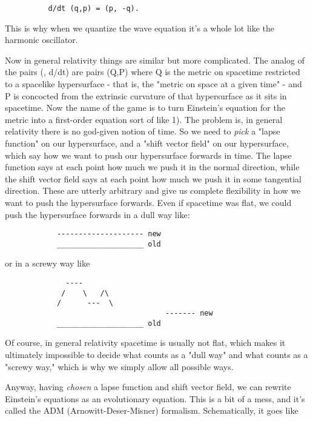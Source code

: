 \begin{verbatim}
		  d/dt (q,p) = (p, -q).  
\end{verbatim}
    
This is why when we quantize the wave equation it's a whole lot like the
harmonic oscillator.

Now in general relativity things are similar but more complicated.  
The analog of the pairs (\phi , d\phi /dt) are pairs (Q,P) where Q is the
metric on spacetime restricted to a spacelike hypersurface - that is,
the "metric on space at a given time" - and P is concocted from the
extrinsic curvature of that hypersurface as it sits in spacetime.   
Now the name of the game is to turn Einstein's equation for the metric
into a first-order equation sort of like 1).  The problem is, in general
relativity there is no god-given notion of time.  So we need to \emph{pick} a
"lapse function" on our hypersurface, and a "shift vector field" on our
hypersurface, which say how we want to push our hypersurface forwards in
time.  The lapse function says at each point how much we push it in the
normal direction, while the shift vector field says at each point how
much we push it in some tangential direction.  These are utterly
arbitrary and give us complete flexibility in how we want to push the
hypersurface forwards.  Even if spacetime was flat, we could push the
hypersurface forwards in a dull way like:




\begin{verbatim}
			-------------------- new
			____________________ old

\end{verbatim}
    
or in a screwy way like

\begin{verbatim}
			  ----
 			 /    \   /\
			/      ---  \
                                     ------- new
			____________________ old

\end{verbatim}
    
Of course, in general relativity spacetime is usually not flat, which
makes it ultimately impossible to decide what counts as a "dull way" and
what counts as a "screwy way," which is why we simply allow all possible
ways.

Anyway, having \emph{chosen} a lapse function and shift vector field, we can
rewrite Einstein's equations as an evolutionary equation.  This is a bit
of a mess, and it's called the ADM (Arnowitt-Deser-Misner) formalism.
Schematically, it goes like
		

